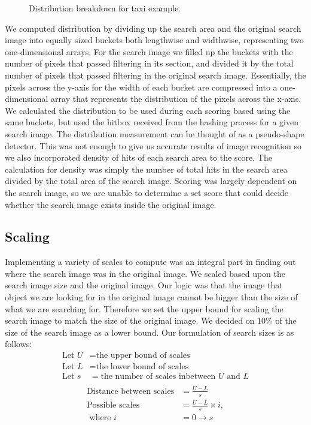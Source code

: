 \documentclass[10pt, journal]{vgtc}                %
\begin{document}
\begin{flushleft}
\begin{figure}[h!]
\caption{Distribution breakdown for taxi example.}
\end{figure}
We computed distribution by dividing up the search area and the original search image into equally sized buckets both lengthwise and widthwise, representing two one-dimensional arrays. For the search image we filled up the buckets with the number of pixels that passed filtering in its section, and divided it by the total number of pixels that passed filtering in the original search image. Essentially, the pixels across the y-axis for the width of each bucket are compressed into a one-dimensional array that represents the distribution of the pixels across the x-axis. We calculated the distribution to be used during each scoring based using the same buckets, but used the hitbox received from the hashing process for a given search image. The distribution measurement can be thought of as a pseudo-shape detector. This was not enough to give us accurate results of image recognition so we also incorporated density of hits of each search area to the score. The calculation for density was simply the number of total hits in the search area divided by the total area of the search image. Scoring was largely dependent on the search image, so we are unable to determine a set score that could decide whether the search image exists inside the original image.

\end{flushleft}
\subsection{Scaling}
Implementing a variety of scales to compute was an integral part in finding out where the search image was in the original image. We scaled based upon the search image size and the original image. Our logic was that the image that object we are looking for in the original image cannot be bigger than the size of what we are searching for. Therefore we set the upper bound for scaling the search image to match the size of the original image. We decided on 10\% of the size of the search image as a lower bound. Our formulation of search sizes is as follows:
\begin{align*}
	\text{Let }U &= \text{the upper bound of scales}\\
	\text{Let }L &= \text{the lower bound of scales}\\
	\text{Let }s &= \text{the number of scales inbetween } U \text{ and } L\\
\end{align*}
\begin{align*}
	\text{Distance} \text{ between scales} &= \frac{U-L}{s}\\
	\text{Poss}\text{ible scales} &=  \frac{U-L}{s} \times i,\\
	\text{ where } i &= 0\rightarrow s\\
\end{align*}
\end{document}
